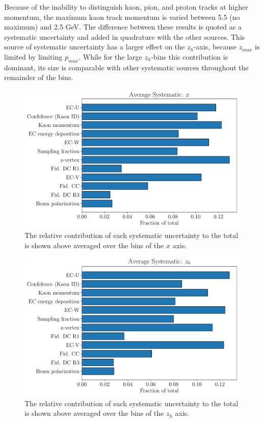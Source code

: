 Because of the inability to distinguish kaon, pion, and proton tracks at higher momentum, the maximum kaon track momentum is varied between 5.5 (no maximum) and 2.5 GeV.  The difference between these results is quoted as a systematic uncertainty and added in quadrature with the other sources.  This source of systematic uncertainty has a larger effect on the $z_h$-axis, because $z_{max}$ is limited by limiting $p_{max}$.  While for the large $z_h$-bins this contribution is dominant, its size is comparable with other systematic sources throughout the remainder of the bins.


\begin{figure}
	\centering
	\includegraphics[width=16cm]{image/plots/kaon-bsa/bar-systematics-x.pdf}
	\caption{The relative contribution of each systematic uncertainty to the total is shown above averaged over the bins of the $x$ axis.}
\end{figure}

\begin{figure}
	\centering
	\includegraphics[width=16cm]{image/plots/kaon-bsa/bar-systematics-z.pdf}
	\caption{The relative contribution of each systematic uncertainty to the total is shown above averaged over the bins of the $z_h$ axis.}
\end{figure}


